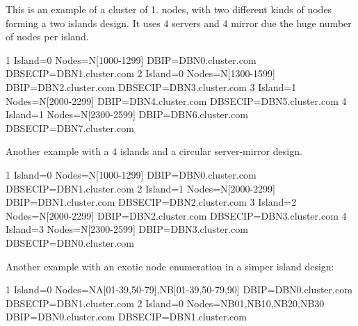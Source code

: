 This is an example of a cluster of 1. nodes, with two different kinds of nodes forming a two islands design. It uses 4 servers and 4 mirror due the huge number of nodes per island.


\begin{DoxyCode}
1 Island=0 Nodes=N[1000-1299] DBIP=DBN0.cluster.com DBSECIP=DBN1.cluster.com
2 Island=0 Nodes=N[1300-1599] DBIP=DBN2.cluster.com DBSECIP=DBN3.cluster.com
3 Island=1 Nodes=N[2000-2299] DBIP=DBN4.cluster.com DBSECIP=DBN5.cluster.com
4 Island=1 Nodes=N[2300-2599] DBIP=DBN6.cluster.com DBSECIP=DBN7.cluster.com
\end{DoxyCode}


Another example with a 4 islands and a circular server-\/mirror design.


\begin{DoxyCode}
1 Island=0 Nodes=N[1000-1299] DBIP=DBN0.cluster.com DBSECIP=DBN1.cluster.com
2 Island=1 Nodes=N[2000-2299] DBIP=DBN1.cluster.com DBSECIP=DBN2.cluster.com
3 Island=2 Nodes=N[2000-2299] DBIP=DBN2.cluster.com DBSECIP=DBN3.cluster.com
4 Island=3 Nodes=N[2300-2599] DBIP=DBN3.cluster.com DBSECIP=DBN0.cluster.com
\end{DoxyCode}


Another example with an exotic node enumeration in a simper island design\+:


\begin{DoxyCode}
1 Island=0 Nodes=NA[01-39,50-79],NB[01-39,50-79,90] DBIP=DBN0.cluster.com DBSECIP=DBN1.cluster.com
2 Island=0 Nodes=NB01,NB10,NB20,NB30 DBIP=DBN0.cluster.com DBSECIP=DBN1.cluster.com
\end{DoxyCode}
 